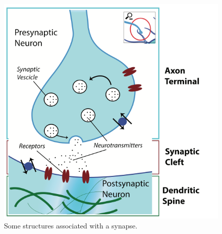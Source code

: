 

\begin{figure}[h]
\centering
\includegraphics[width=.45\textwidth]{./images/synaptic_cleft.png}
\caption[Pamela Payne.]{Some structures associated with a synapse.}
\label{f:synapse}
\end{figure}

